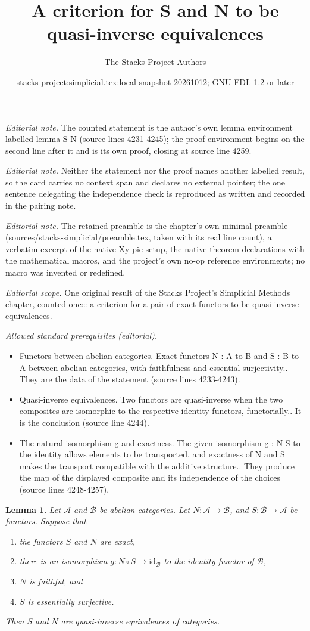 \documentclass{stacks-project}
\title{A criterion for S and N to be quasi-inverse equivalences}
\author{The Stacks Project Authors}
\date{stacks-project:simplicial.tex:local-snapshot-20261012; GNU FDL 1.2 or later}
\theoremstyle{plain}
\newtheorem{lemma}[subsection]{Lemma}
\theoremstyle{definition}
\theoremstyle{remark}
\numberwithin{equation}{subsection}
\begin{document}
\maketitle
\noindent\textit{Editorial note.} The counted statement is the author's own lemma environment labelled lemma-S-N (source lines 4231-4245); the proof environment begins on the second line after it and is its own proof, closing at source line 4259.\par\medskip
\noindent\textit{Editorial note.} Neither the statement nor the proof names another labelled result, so the card carries no context span and declares no external pointer; the one sentence delegating the independence check is reproduced as written and recorded in the pairing note.\par\medskip
\noindent\textit{Editorial note.} The retained preamble is the chapter's own minimal preamble (sources/stacks-simplicial/preamble.tex, taken with its real line count), a verbatim excerpt of the native Xy-pic setup, the native theorem declarations with the mathematical macros, and the project's own no-op reference environments; no macro was invented or redefined.\par\medskip
\noindent\textit{Editorial scope.} One original result of the Stacks Project's Simplicial Methods chapter, counted once: a criterion for a pair of exact functors to be quasi-inverse equivalences.\par\medskip
\noindent\textit{Allowed standard prerequisites (editorial).}\begin{itemize}
\item Functors between abelian categories. Exact functors N : A to B and S : B to A between abelian categories, with faithfulness and essential surjectivity.. They are the data of the statement (source lines 4233-4243).
\item Quasi-inverse equivalences. Two functors are quasi-inverse when the two composites are isomorphic to the respective identity functors, functorially.. It is the conclusion (source line 4244).
\item The natural isomorphism g and exactness. The given isomorphism g : N S to the identity allows elements to be transported, and exactness of N and S makes the transport compatible with the additive structure.. They produce the map of the displayed composite and its independence of the choices (source lines 4248-4257).
\end{itemize}\medskip
\begin{lemma}
\label{lemma-S-N}
Let $\mathcal{A}$ and $\mathcal{B}$ be abelian categories.
Let $N : \mathcal{A} \to \mathcal{B}$, and
$S : \mathcal{B} \to \mathcal{A}$ be functors.
Suppose that
\begin{enumerate}
\item the functors $S$ and $N$ are exact,
\item there is an isomorphism $g : N \circ S \to \text{id}_\mathcal{B}$
to the identity functor of $\mathcal{B}$,
\item $N$ is faithful, and
\item $S$ is essentially surjective.
\end{enumerate}
Then $S$ and $N$ are quasi-inverse equivalences of categories.
\end{lemma}
\end{document}
